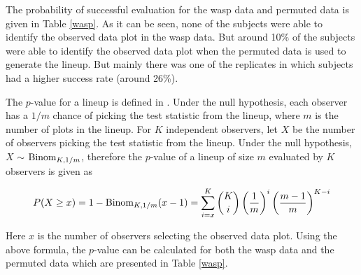 \documentclass[12]{article}
\begin{document}

The probability of successful evaluation for the wasp data and permuted data is given in Table \ref{wasp}. As it can be seen, none of the subjects were able to identify the observed data plot in the wasp data. But around 10\% of the subjects were able to identify the observed data plot when the permuted data is used to generate the lineup.  But mainly there was one of the replicates in which subjects had a higher success rate (around 26\%). 



The $p$-value for a lineup is defined in \cite{majumder:2011}. Under the null hypothesis, each observer has a $1/m$ chance of picking the test statistic from the lineup, where $m$ is the number of plots in the lineup. For $K$ independent observers, let $X$ be the number of observers picking the test statistic from the lineup. Under the null hypothesis, $X$ $\sim$ $\hbox{Binom}_{K, 1/m}$, therefore the $p$-value of a lineup of size $m$ evaluated by $K$ observers is given as

$$P(X \ge x) = 1 - \hbox{Binom}_{K, 1/m}(x - 1) = \sum_{i = x}^K {K \choose i} \left(\frac{1}{m} \right)^i \left(\frac{m - 1}{m}\right)^{K - i}$$

Here $x$ is the number of observers selecting the observed data plot. Using the above formula, the $p$-value can be calculated for both the wasp data and the permuted data which are presented in Table \ref{wasp}.  
\end{document}
